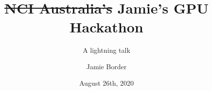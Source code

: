 \documentclass{beamer}
\newcommand{\mybox}[3]{{\color{#1}\framebox{\color{#2}#3}}}
\begin{document}
\title[]{\sout{NCI Australia's} Jamie's GPU Hackathon} %
\subtitle[]{A lightning talk} %
\author[]{Jamie Border}
\date{August 26th, 2020}

  \frame{\maketitle}




      
\end{document}
